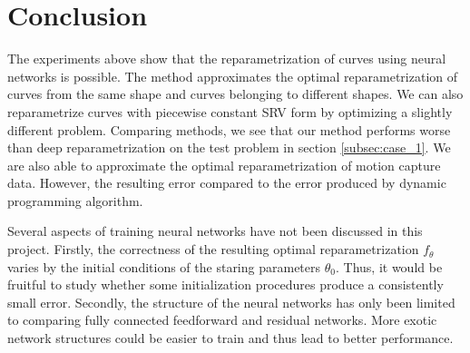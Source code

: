 \section{Conclusion}
The experiments above show that the reparametrization of curves using neural networks is possible. The method approximates the optimal reparametrization of curves from the same shape and curves belonging to different shapes. We can also reparametrize curves with piecewise constant SRV form by optimizing a slightly different problem. Comparing methods, we see that our method performs worse than deep reparametrization \cite{jørgen2021} on the test problem in section \ref{subsec:case_1}. We are also able to approximate the optimal reparametrization of motion capture data. However, the resulting error compared to the error produced by dynamic programming algorithm\cite{lystad2019}.

Several aspects of training neural networks have not been discussed in this project. Firstly, the correctness of the resulting optimal reparametrization \(f_\theta\) varies by the initial conditions of the staring parameters \(\theta_0\). Thus, it would be fruitful to study whether some initialization procedures produce a consistently small error. Secondly, the structure of the neural networks has only been limited to comparing fully connected feedforward and residual networks. More exotic network structures could be easier to train and thus lead to better performance. 